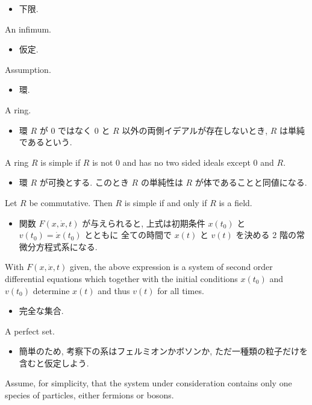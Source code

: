 \documentclass[openany, a4paper, oneside]{jsbook}
\begin{document}
\begin{itemize}
\item 下限.
\end{itemize}
An infimum.

\begin{itemize}
\item 仮定.
\end{itemize}
Assumption.

\begin{itemize}
\item 環.
\end{itemize}
A ring.

\begin{itemize}
\item 環 $R$ が $0$ ではなく $0$ と $R$ 以外の両側イデアルが存在しないとき, $R$ は単純であるという.
\end{itemize}
A ring $R$ is simple if $R$ is not $0$ and has no two sided ideals except $0$ and $R$.

\begin{itemize}
\item 環 $R$ が可換とする. このとき $R$ の単純性は $R$ が体であることと同値になる.
\end{itemize}
Let $R$ be commutative.
Then $R$ is simple if and only if $R$ is a field.

\begin{itemize}
\item 関数 $F(x, \dot{x}, t)$ が与えられると, 上式は初期条件 $x(t_0)$ と $v(t_0) = \dot{x}(t_0)$ とともに
全ての時間で $x(t)$ と $v(t)$ を決める 2 階の常微分方程式系になる. \cite{LiebSeiringer1}
\end{itemize}
With $F(x, \dot{x}, t)$ given, the above expression is a system of second order
differential equations which together with the initial conditions
$x(t_0)$ and $v(t_0)$ determine $x(t)$ and thus $v(t)$ for all times.

\begin{itemize}
\item 完全な集合.
\end{itemize}
A perfect set.

\begin{itemize}
\item 簡単のため, 考察下の系はフェルミオンかボソンか, ただ一種類の粒子だけを含むと仮定しよう. \cite{LiebSeiringer1}
\end{itemize}
Assume, for simplicity, that the system under consideration contains only one species of particles,
either fermions or bosons.
\end{document}
